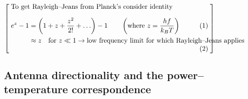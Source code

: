\documentclass[11pt, oneside]{article}
\begin{document}
\noindent\hspace*{2.2em}$\left[\;\begin{minipage}{0.84\linewidth}
To get Rayleigh--Jeans from Planck's consider identity
\begin{align*}
	e^z - 1 &= \left(1 + z + \frac{z^2}{2!} + \ldots\right) - 1 \qquad \left(\text{where } z = \frac{hf}{k_BT}\right)\\
	&\approx z \quad \text{for } z \ll 1 \rightarrow \text{low frequency limit for which Rayleigh--Jeans applies}
\end{align*}
\end{minipage}\;\right]$

\subsection{Antenna directionality and the power--temperature correspondence}
\label{s:antenna}
\end{document}
